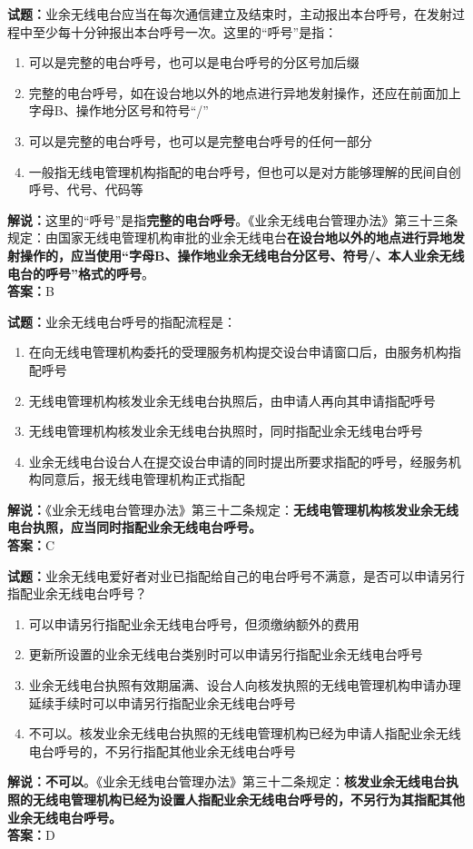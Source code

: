 \documentclass{ctexbook}
\begin{document}
\bigskip




\noindent\textbf{试题：}业余无线电台应当在每次通信建立及结束时，主动报出本台呼号，在发射过程中至少每十分钟报出本台呼号一次。这里的“呼号”是指：
\begin{enumerate}[leftmargin=3em]
\item 可以是完整的电台呼号，也可以是电台呼号的分区号加后缀
\item 完整的电台呼号，如在设台地以外的地点进行异地发射操作，还应在前面加上字母B、操作地分区号和符号“/”
\item 可以是完整的电台呼号，也可以是完整电台呼号的任何一部分
\item 一般指无线电管理机构指配的电台呼号，但也可以是对方能够理解的民间自创呼号、代号、代码等
\end{enumerate}
\noindent\textbf{解说：}这里的“呼号”是指\textbf{完整的电台呼号}。《业余无线电台管理办法》第三十三条规定：由国家无线电管理机构审批的业余无线电台\textbf{在设台地以外的地点进行异地发射操作的，应当使用“字母B、操作地业余无线电台分区号、符号/、本人业余无线电台的呼号”格式的呼号}。\\\noindent\textbf{答案：}B

\bigskip




\noindent\textbf{试题：}业余无线电台呼号的指配流程是：
\begin{enumerate}[leftmargin=3em]
\item 在向无线电管理机构委托的受理服务机构提交设台申请窗口后，由服务机构指配呼号
\item 无线电管理机构核发业余无线电台执照后，由申请人再向其申请指配呼号
\item 无线电管理机构核发业余无线电台执照时，同时指配业余无线电台呼号
\item 业余无线电台设台人在提交设台申请的同时提出所要求指配的呼号，经服务机构同意后，报无线电管理机构正式指配
\end{enumerate}
\noindent\textbf{解说：}《业余无线电台管理办法》第三十二条规定：\textbf{无线电管理机构核发业余无线电台执照，应当同时指配业余无线电台呼号。}\\\noindent\textbf{答案：}C

\bigskip




\noindent\textbf{试题：}业余无线电爱好者对业已指配给自己的电台呼号不满意，是否可以申请另行指配业余无线电台呼号？
\begin{enumerate}[leftmargin=3em]
\item 可以申请另行指配业余无线电台呼号，但须缴纳额外的费用
\item 更新所设置的业余无线电台类别时可以申请另行指配业余无线电台呼号
\item 业余无线电台执照有效期届满、设台人向核发执照的无线电管理机构申请办理延续手续时可以申请另行指配业余无线电台呼号
\item 不可以。核发业余无线电台执照的无线电管理机构已经为申请人指配业余无线电台呼号的，不另行指配其他业余无线电台呼号
\end{enumerate}
\textbf{解说：不可以}。《业余无线电台管理办法》第三十二条规定：\textbf{核发业余无线电台执照的无线电管理机构已经为设置人指配业余无线电台呼号的，不另行为其指配其他业余无线电台呼号。}\\\noindent\textbf{答案：}D
\end{document}
